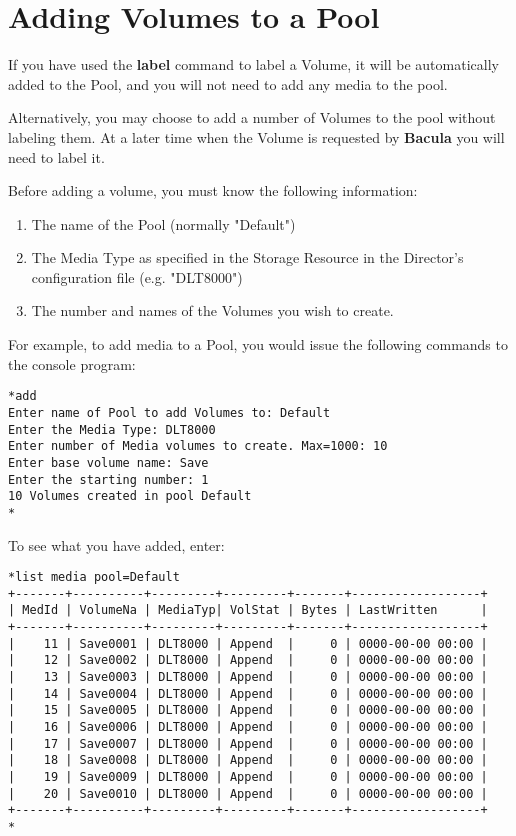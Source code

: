 \section{Adding Volumes to a Pool}

If you have used the {\bf label} command to label a Volume, it will be
automatically added to the Pool, and you will not need to add any media to the
pool. 

Alternatively, you may choose to add a number of Volumes to the pool without
labeling them. At a later time when the Volume is requested by {\bf Bacula}
you will need to label it. 

Before adding a volume, you must know the following information: 

\begin{enumerate}
\item The name of the Pool (normally "Default")  
\item The Media Type as specified in the Storage Resource  in the Director's
   configuration file (e.g. "DLT8000")  
\item The number and names of the Volumes you wish to create. 
\end{enumerate}

For example, to add media to a Pool, you would issue the following commands to
the console program: 

\footnotesize
\begin{verbatim}
*add
Enter name of Pool to add Volumes to: Default
Enter the Media Type: DLT8000
Enter number of Media volumes to create. Max=1000: 10
Enter base volume name: Save
Enter the starting number: 1
10 Volumes created in pool Default
*
\end{verbatim}
\normalsize

To see what you have added, enter: 

\footnotesize
\begin{verbatim}
*list media pool=Default
+-------+----------+---------+---------+-------+------------------+
| MedId | VolumeNa | MediaTyp| VolStat | Bytes | LastWritten      |
+-------+----------+---------+---------+-------+------------------+
|    11 | Save0001 | DLT8000 | Append  |     0 | 0000-00-00 00:00 |
|    12 | Save0002 | DLT8000 | Append  |     0 | 0000-00-00 00:00 |
|    13 | Save0003 | DLT8000 | Append  |     0 | 0000-00-00 00:00 |
|    14 | Save0004 | DLT8000 | Append  |     0 | 0000-00-00 00:00 |
|    15 | Save0005 | DLT8000 | Append  |     0 | 0000-00-00 00:00 |
|    16 | Save0006 | DLT8000 | Append  |     0 | 0000-00-00 00:00 |
|    17 | Save0007 | DLT8000 | Append  |     0 | 0000-00-00 00:00 |
|    18 | Save0008 | DLT8000 | Append  |     0 | 0000-00-00 00:00 |
|    19 | Save0009 | DLT8000 | Append  |     0 | 0000-00-00 00:00 |
|    20 | Save0010 | DLT8000 | Append  |     0 | 0000-00-00 00:00 |
+-------+----------+---------+---------+-------+------------------+
*
\end{verbatim}
\normalsize


